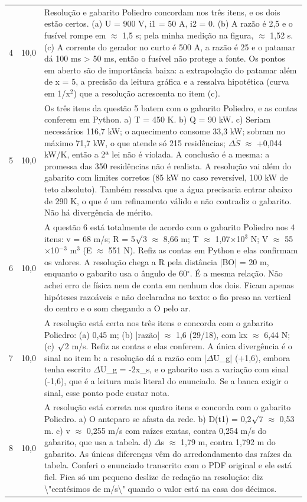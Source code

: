 \documentclass{article}%
\begin{document}
\begin{longtable}{@{}c c p{}@{}}
4 & 10,0 & Resolução e gabarito Poliedro concordam nos três itens, e os dois estão certos. (a) U = 900 V, i1 = 50 A, i2 = 0. (b) A razão é 2,5 e o fusível rompe em $\approx$ 1,5 s; pela minha medição na figura, $\approx$ 1,52 s. (c) A corrente do gerador no curto é 500 A, a razão é 25 e o patamar dá 100 ms > 50 ms, então o fusível não protege a fonte. Os pontos em aberto são de importância baixa: a extrapolação do patamar além de x = 5, a precisão da leitura gráfica e a ressalva hipotética (curva em 1/x$^2$) que a resolução acrescenta no item (c). \\
5 & 10,0 & Os três itens da questão 5 batem com o gabarito Poliedro, e as contas conferem em Python. a) T = 450 K. b) Q = 90 kW. c) Seriam necessários 116,7 kW; o aquecimento consome 33,3 kW; sobram no máximo 71,7 kW, o que atende só 215 residências; $\Delta$$\dot S$ $\approx$ +0,044 kW/K, então a 2ª lei não é violada. A conclusão é a mesma: a promessa das 350 residências não é realista. A resolução vai além do gabarito com limites corretos (85 kW no caso reversível, 100 kW de teto absoluto). Também ressalva que a água precisaria entrar abaixo de 290 K, o que é um refinamento válido e não contradiz o gabarito. Não há divergência de mérito. \\
6 & 10,0 & A questão 6 está totalmente de acordo com o gabarito Poliedro nos 4 itens: v = 68 m/s; R = 5$\surd$3 $\approx$ 8,66 m; T $\approx$ 1,07$\times$10$^3$ N; V $\approx$ 55$\times$10$^{-}$$^3$ m$^3$ (E $\approx$ 551 N). Refiz as contas em Python e elas confirmam os valores. A resolução chega a R pela distância |BO| = 20 m, enquanto o gabarito usa o ângulo de 60$^\circ$. É a mesma relação. Não achei erro de física nem de conta em nenhum dos dois. Ficam apenas hipóteses razoáveis e não declaradas no texto: o fio preso na vertical do centro e o som chegando a O pelo ar. \\
7 & 10,0 & A resolução está certa nos três itens e concorda com o gabarito Poliedro: (a) 0,45 m; (b) |razão| $\approx$ 1,6 (29/18), com kx $\approx$ 6,44 N; (c) $\surd$2 m/s. Refiz as contas e elas conferem. A única divergência é o sinal no item b: a resolução dá a razão com |$\Delta$U\_g| (+1,6), embora tenha escrito $\Delta$U\_g = -2x\_s, e o gabarito usa a variação com sinal (-1,6), que é a leitura mais literal do enunciado. Se a banca exigir o sinal, esse ponto pode custar nota. \\
8 & 10,0 & A resolução está correta nos quatro itens e concorda com o gabarito Poliedro. a) O anteparo se afasta da rede. b) D(t1) = 0,2$\surd$7 $\approx$ 0,53 m. c) v $\approx$ 0,255 m/s com raízes exatas, contra 0,254 m/s do gabarito, que usa a tabela. d) $\Delta$s $\approx$ 1,79 m, contra 1,792 m do gabarito. As únicas diferenças vêm do arredondamento das raízes da tabela. Conferi o enunciado transcrito com o PDF original e ele está fiel. Fica só um pequeno deslize de redação na resolução: diz \textbackslash{}"centésimos de m/s\textbackslash{}" quando o valor está na casa dos décimos. \\

\end{longtable}
\end{document}
